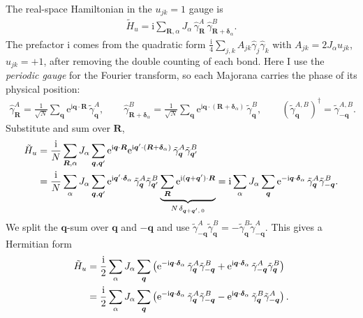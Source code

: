 \documentclass[
  aps,
  prl,
  preprint,
  amsmath,
  amssymb,
  superscriptaddress,
  floatfix
]{revtex4-2}
\newcommand{\ii}{\mathrm{i}}
\newcommand{\ee}{\mathrm{e}}
\newcommand{\oga}{\hat \gamma}
\begin{document}
The real-space Hamiltonian in the $u_{jk}=1$ gauge is
\begin{align}
  \tilde{H}_u = \ii \sum_{\bm R,\alpha} J_\alpha\, \oga_{\bm R}^A\, \oga_{\bm R+\bm\delta_\alpha}^B .
  \label{eq:sm_realspace}
\end{align}
The prefactor $\ii$ comes from the quadratic form
$\tfrac{\ii}{4}\sum_{j,k}A_{jk}\oga_j\oga_k$ with $A_{jk}=2J_\alpha u_{jk}$,
$u_{jk}=+1$, after removing the double counting of each bond. Here I use the
\emph{periodic gauge} for the Fourier transform, so each Majorana
carries the phase of its physical position:
\begin{align}
  \oga_{\bm R}^A = \frac{1}{\sqrt{N}}\sum_{\bm q} \ee^{\ii \bm q\cdot \bm R}\, \tilde\gamma_{\bm q}^A,
  \qquad
  \oga_{\bm R+\bm\delta_\alpha}^B = \frac{1}{\sqrt{N}}\sum_{\bm q} \ee^{\ii \bm q\cdot (\bm R + \bm\delta_\alpha)}\, \tilde\gamma_{\bm q}^B,
  \qquad (\tilde\gamma_{\bm q}^{A,B})^\dag=\tilde\gamma_{-\bm q}^{A,B}.
  \label{eq:sm_FT}
\end{align}
Substitute and sum over $\bm R$,
\begin{align}
  \tilde H_u &= \frac{\ii}{N}\sum_{\bm R,\alpha} J_\alpha \sum_{\bm q,\bm q'} \ee^{\ii \bm q \cdot \bm R} \ee^{\ii \bm q' \cdot (\bm R + \bm\delta_\alpha)}\, \tilde{\gamma}_{\bm q}^A \tilde{\gamma}_{\bm q'}^B \notag\\
  &= \frac{\ii}{N} \sum_{\alpha} J_\alpha \sum_{\bm q,\bm q'} \ee^{\ii \bm q' \cdot \bm\delta_\alpha}\, \tilde{\gamma}_{\bm q}^A \tilde{\gamma}_{\bm q'}^B \underbrace{\sum_{\bm R} \ee^{\ii (\bm q + \bm q') \cdot\bm R }}_{N\,\delta_{\bm q+\bm q',\,0}}
  = \ii \sum_\alpha J_{\alpha} \sum_{\bm q} \ee^{-\ii \bm q \cdot \bm\delta_\alpha}\, \tilde{\gamma}_{\bm q}^A \tilde{\gamma}_{-\bm q}^B .
\end{align}
We split the $\bm q$-sum over $\bm q$ and $-\bm q$ and use
$\tilde\gamma_{-\bm q}^A \tilde\gamma_{\bm q}^B =
-\tilde\gamma_{\bm q}^B \tilde\gamma_{-\bm q}^A$. This gives a
Hermitian form
\begin{align}
  \tilde H_u &= \frac{\ii}{2}\sum_\alpha J_\alpha \sum_{\bm q}\left( \ee^{-\ii \bm q\cdot\bm\delta_\alpha}\, \tilde\gamma_{\bm q}^A \tilde\gamma_{-\bm q}^B + \ee^{\ii \bm q\cdot\bm\delta_\alpha}\, \tilde\gamma_{-\bm q}^A \tilde\gamma_{\bm q}^B \right) \notag\\
  &= \frac{\ii}{2}\sum_\alpha J_\alpha \sum_{\bm q}\left( \ee^{-\ii \bm q\cdot\bm\delta_\alpha}\, \tilde\gamma_{\bm q}^A \tilde\gamma_{-\bm q}^B - \ee^{\ii \bm q\cdot\bm\delta_\alpha}\, \tilde\gamma_{\bm q}^B \tilde\gamma_{-\bm q}^A \right).
\end{align}
\end{document}
